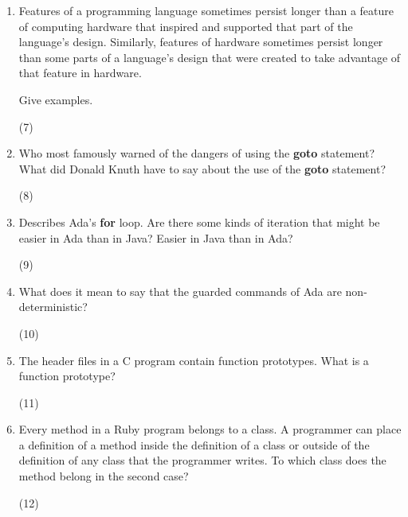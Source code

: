 \begin{enumerate}
  \item Features of a programming language sometimes persist
    longer than a feature of computing hardware that inspired
    and supported that part of the language's design.
    Similarly, features of hardware sometimes persist longer
    than some parts of a language's design that were created
    to take advantage of that feature in hardware.

    Give examples.

 \begin{answer}
    (7)
     \end{answer}

  \item Who most famously warned of the dangers of using the
    \textbf{goto} statement? What did Donald Knuth have to
    say about the use of the \textbf{goto} statement?

 \begin{answer}
    (8)
     \end{answer}

  \item Describes Ada's \textbf{for} loop. Are there some
    kinds of iteration that might be easier in Ada than
    in Java? Easier in Java than in Ada?

 \begin{answer}
    (9)
   \end{answer}
   
  \item What does it mean to say that the guarded commands
    of Ada are non-deterministic?

 \begin{answer}
    (10)
     \end{answer}

  \item The header files in a C program contain function
    prototypes. What is a function prototype?

 \begin{answer}
   (11)
 \end{answer}

  \item Every method in a Ruby program belongs to a class.
    A programmer can place a definition of a method inside
    the definition of a class or outside of the definition
    of any class that the programmer writes. To which class
    does the method belong in the second case?

 \begin{answer}
    (12)
     \end{answer}


\end{enumerate}

